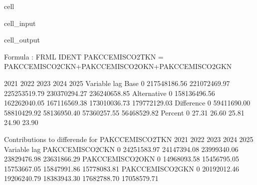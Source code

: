 \documentclass[letterpaper,10pt,english]{jupyterBook}
\begin{document}
\begin{sphinxuseclass}{cell}\begin{sphinxVerbatimInput}

\begin{sphinxuseclass}{cell_input}
\begin{sphinxVerbatim}[commandchars=\\\{\}]
 
    \PYG{p}{[}\PYG{p}{]}
\end{sphinxVerbatim}

\end{sphinxuseclass}\end{sphinxVerbatimInput}
\begin{sphinxVerbatimOutput}

\begin{sphinxuseclass}{cell_output}
\begin{sphinxVerbatim}[commandchars=\\\{\}]
Formula        : FRML \PYGZlt{}IDENT\PYGZgt{} PAKCCEMISCO2TKN = PAKCCEMISCO2CKN+PAKCCEMISCO2OKN+PAKCCEMISCO2GKN \PYGZdl{} 

                        2021         2022         2023         2024         2025
Variable    lag                                                                 
Base        0   217548186.56 221072469.97 225253519.79 230370294.27 236240658.85
Alternative 0   158136496.56 162262040.05 167116569.38 173010036.73 179772129.03
Difference  0   \PYGZhy{}59411690.00 \PYGZhy{}58810429.92 \PYGZhy{}58136950.40 \PYGZhy{}57360257.55 \PYGZhy{}56468529.82
Percent     0         \PYGZhy{}27.31       \PYGZhy{}26.60       \PYGZhy{}25.81       \PYGZhy{}24.90       \PYGZhy{}23.90

 Contributions to differende for  PAKCCEMISCO2TKN
                            2021         2022         2023         2024         2025
Variable        lag                                                                 
PAKCCEMISCO2CKN 0   \PYGZhy{}24251583.97 \PYGZhy{}24147394.08 \PYGZhy{}23999340.06 \PYGZhy{}23829476.98 \PYGZhy{}23631866.29
PAKCCEMISCO2OKN 0   \PYGZhy{}14968093.58 \PYGZhy{}15456795.05 \PYGZhy{}15753667.05 \PYGZhy{}15847991.86 \PYGZhy{}15778083.81
PAKCCEMISCO2GKN 0   \PYGZhy{}20192012.46 \PYGZhy{}19206240.79 \PYGZhy{}18383943.30 \PYGZhy{}17682788.70 \PYGZhy{}17058579.71


\end{sphinxVerbatim}
\end{sphinxuseclass}
\end{sphinxVerbatimOutput}
\end{sphinxuseclass}
\end{document}
